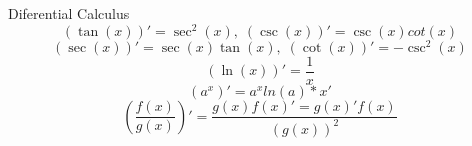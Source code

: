 \begin{section}{Diferential Calculus}
$$(\tan(x))' = \sec ^2(x),\; (\csc (x))' = \csc(x)cot(x)$$
$$(\sec (x))' = \sec (x) \tan (x) ,\; (\cot (x))' = -\csc^2 (x)$$
$$(\ln (x))' = \frac{1}{x}$$
$$(a^{x})' = a^{x}ln(a)*x'$$
$$(\frac{f(x)}{g(x)})' = \frac{g(x)f(x)' = g(x)'f(x)}{(g(x))^2}$$


\end{section}
